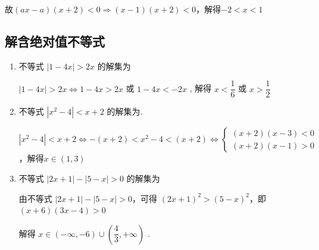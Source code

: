 \begin{enumerate}
\begin{jieda}
         故$\left( {{ax} - a}\right) \left( {x + 2}\right)  < 0 \Longrightarrow  \left( {x - 1}\right) \left( {x + 2}\right)  < 0$，解得$- 2 < x < 1$ 
    \end{jieda}
\end{enumerate}

\subsection*{解含绝对值不等式}
\begin{enumerate}
    \item 不等式 $\left| {1 - {4x}}\right|  > {2x}$ 的解集为 
    \begin{jieda}
        $\left| {1 - {4x}}\right|  > {2x} \Longleftrightarrow 1 - {4x} > {2x}$ 或 $1 - {4x} <  - {2x}$ , 解得 $x < \dfrac{1}{6}$ 或 $x > \dfrac{1}{2}$
    \end{jieda}
    \item 不等式 $\left| {{x}^{2} - 4}\right|  < x + 2$ 的解集为. 
    \begin{jieda}
        $\left| {{x}^{2} - 4}\right|  < x + 2 \Longleftrightarrow -(x+2) < x^2-4 < (x+2) \Longleftrightarrow \left\{\begin{array}{l}
             (x+2)(x-3) < 0  \\
             (x+2)(x-1) > 0
        \end{array}\right.$，解得$ x \in (1,3)$
    \end{jieda}

    \item 不等式 $\left| {{2x} + 1}\right|  - \left| {5 - x}\right|  > 0$ 的解集为
    \begin{jieda}
        由不等式 $\left| {{2x} + 1}\right|  - \left| {5 - x}\right|  > 0$，可得 ${\left( 2x + 1\right) }^{2} > {\left( 5 - x\right) }^{2}$，即 $\left( {x + 6}\right) \left( {{3x} - 4}\right)  > 0$
        
        解得 $x \in  \left( {-\infty , - 6}\right)  \cup  \left( {\dfrac{4}{3}, + \infty }\right)$ .
    \end{jieda}
\end{enumerate}

